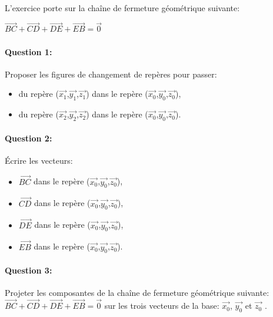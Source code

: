 ~\

L'exercice porte sur la chaîne de fermeture géométrique suivante:

$\overrightarrow{BC}+\overrightarrow{CD}+\overrightarrow{DE}+\overrightarrow{EB}=\overrightarrow{0}$

\paragraph{Question 1:}

Proposer les figures de changement de repères pour passer:
\begin{itemize}
 \item du repère ($\overrightarrow{x_1}$,$\overrightarrow{y_1}$,$\overrightarrow{z_1}$) dans le repère ($\overrightarrow{x_0}$,$\overrightarrow{y_0}$,$\overrightarrow{z_0}$),
  \item du repère ($\overrightarrow{x_2}$,$\overrightarrow{y_2}$,$\overrightarrow{z_2}$) dans le repère ($\overrightarrow{x_0}$,$\overrightarrow{y_0}$,$\overrightarrow{z_0}$).
\end{itemize}

\paragraph{Question 2:}

Écrire les vecteurs:
\begin{itemize}
 \item $\overrightarrow{BC}$ dans le repère ($\overrightarrow{x_0}$,$\overrightarrow{y_0}$,$\overrightarrow{z_0}$),
 \item $\overrightarrow{CD}$ dans le repère ($\overrightarrow{x_0}$,$\overrightarrow{y_0}$,$\overrightarrow{z_0}$),
 \item $\overrightarrow{DE}$ dans le repère ($\overrightarrow{x_0}$,$\overrightarrow{y_0}$,$\overrightarrow{z_0}$),
 \item $\overrightarrow{EB}$ dans le repère ($\overrightarrow{x_0}$,$\overrightarrow{y_0}$,$\overrightarrow{z_0}$).
\end{itemize}

\paragraph{Question 3:}

Projeter les composantes de la chaîne de fermeture géométrique suivante: $\overrightarrow{BC}+\overrightarrow{CD}+\overrightarrow{DE}+\overrightarrow{EB}=\overrightarrow{0}$ sur les trois vecteurs de la base: $\overrightarrow{x_0}$, $\overrightarrow{y_0}$ et $\overrightarrow{z_0}$ .

